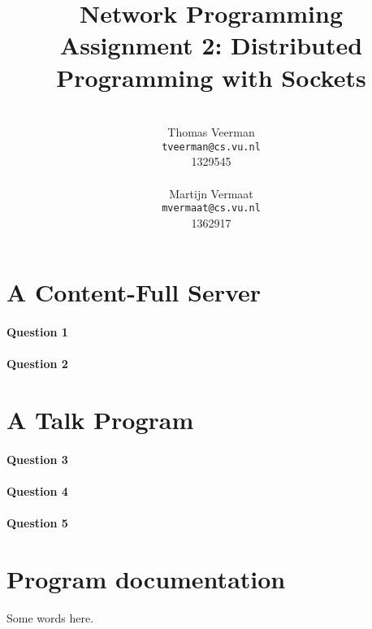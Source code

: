 \documentclass[a4paper,10pt]{article}
\title{Network Programming\\
\small{Assignment 2: Distributed Programming with Sockets}}
\author{%
        \mbox{}\\
        Thomas Veerman\\
        \texttt{tveerman@cs.vu.nl}\\
        1329545\\
        \mbox{}\\
        Martijn Vermaat\\
        \texttt{mvermaat@cs.vu.nl}\\
        1362917
}
\begin{document}
\maketitle


\section{A Content-Full Server}
\paragraph{Question 1}

\paragraph{Question 2}


\section{A Talk Program}
\paragraph{Question 3}

\paragraph{Question 4}

\paragraph{Question 5}


\section{Program documentation}

Some words here.
\end{document}
